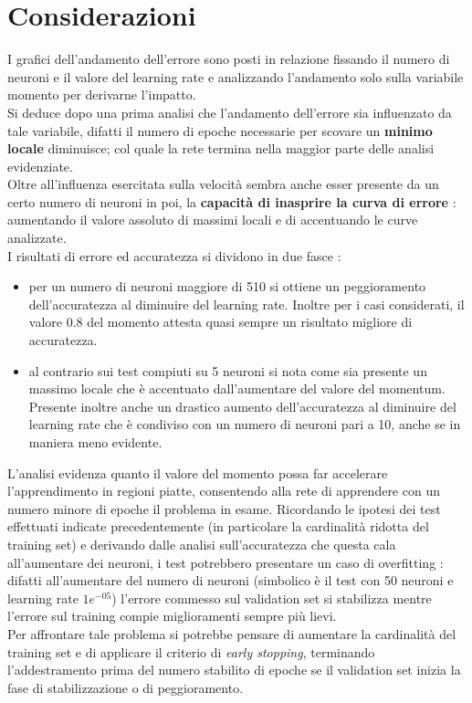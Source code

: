 \section{Considerazioni}
I grafici dell'andamento dell'errore sono posti in relazione fissando il numero di neuroni e il valore del learning rate e analizzando l'andamento solo sulla variabile momento per derivarne l'impatto.\\
Si deduce dopo una prima analisi che l'andamento dell'errore sia influenzato da tale variabile, difatti il numero di epoche necessarie per scovare un \textbf{minimo locale} diminuisce; col quale la rete termina nella maggior parte delle analisi evidenziate.\\
Oltre all'influenza esercitata sulla velocità sembra anche esser presente da un certo numero di neuroni in poi, la \textbf{capacità di inasprire la curva di errore} : aumentando il valore assoluto di massimi locali e di accentuando le curve analizzate. \\
I risultati di errore ed accuratezza si dividono in due fasce :
\begin{itemize}
    \item per un numero di neuroni maggiore di 510 si ottiene un peggioramento dell'accuratezza al diminuire del learning rate. Inoltre per i casi considerati, il valore 0.8 del momento attesta quasi sempre un risultato migliore di accuratezza.
    \item al contrario sui test compiuti su 5 neuroni si nota come sia presente un massimo locale che è accentuato dall'aumentare del valore del momentum. Presente inoltre anche un drastico aumento dell'accuratezza al diminuire del learning rate che è condiviso con un numero di neuroni pari a 10, anche se in maniera meno evidente.
\end{itemize}
L'analisi evidenza quanto il valore del momento possa far accelerare l'apprendimento in regioni piatte, consentendo alla rete di apprendere con un numero minore di epoche il problema in esame.
Ricordando le ipotesi dei test effettuati indicate precedentemente (in particolare la cardinalità ridotta del training set) e derivando dalle analisi sull'accuratezza che questa cala all'aumentare dei neuroni, i test potrebbero presentare un caso di overfitting : difatti all'aumentare del numero di neuroni (simbolico è il test con 50 neuroni e learning rate $1e^{-05}$) l'errore commesso sul validation set si stabilizza mentre l'errore sul training compie miglioramenti sempre più lievi.\\
Per affrontare tale problema si potrebbe pensare di aumentare la cardinalità del training set e di applicare il criterio di \textit{early stopping}, terminando l'addestramento prima del numero stabilito di epoche se il validation set inizia la fase di stabilizzazione o di peggioramento.\\
